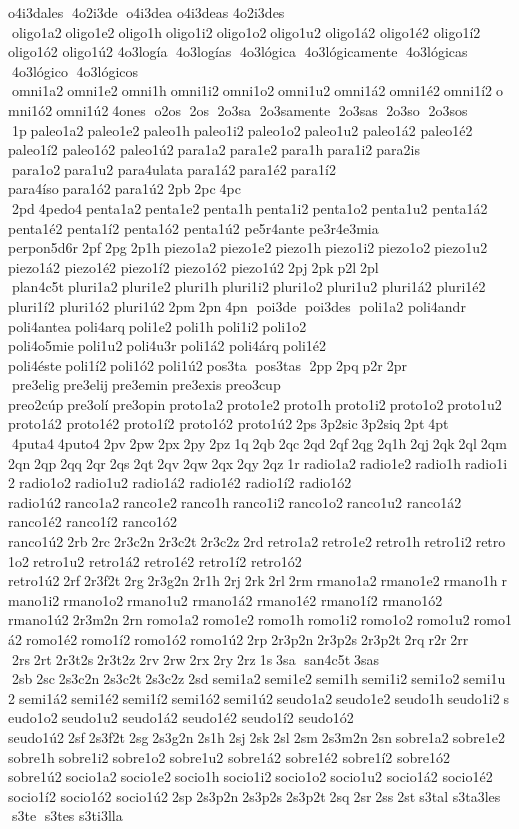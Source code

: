 o4i3dales  4o2i3de  o4i3dea  	o4i3deas  	4o2i3des  oligo1a2 oligo1e2 oligo1h oligo1i2 oligo1o2 oligo1u2 	oligo1á2 	oligo1é2 	oligo1í2 	oligo1ó2 	oligo1ú2 
4o3logía  4o3logías  4o3lógica  4o3lógicamente  4o3lógicas  4o3lógico  4o3lógicos  omni1a2 omni1e2 omni1h omni1i2 omni1o2 omni1u2 omni1á2 omni1é2 omni1í2 omni1ó2 omni1ú2 4ones  o2os  2os  2o3sa  2o3samente  2o3sas  2o3so  2o3sos  1p paleo1a2 paleo1e2 paleo1h paleo1i2 paleo1o2 paleo1u2 	paleo1á2 	paleo1é2 	paleo1í2 	paleo1ó2 	paleo1ú2 para1a2 para1e2 para1h para1i2 para2is  para1o2 para1u2 
para4ulata para1á2 para1é2 para1í2 	para4íso para1ó2 para1ú2 2pb 2pc 4pc  2pd 4pedo4 penta1a2 penta1e2 penta1h penta1i2 penta1o2 penta1u2 	penta1á2 	penta1é2 	penta1í2 	penta1ó2 	penta1ú2 	pe5r4ante 
pe3r4e3mia 
perpon5d6r 2pf 2pg 2p1h piezo1a2 piezo1e2 piezo1h piezo1i2 piezo1o2 piezo1u2 	piezo1á2 	piezo1é2 	piezo1í2 	piezo1ó2 	piezo1ú2 2pj 2pk p2l 2pl  plan4c5t pluri1a2 pluri1e2 pluri1h pluri1i2 pluri1o2 pluri1u2 	pluri1á2 	pluri1é2 	pluri1í2 	pluri1ó2 	pluri1ú2 2pm 2pn 4pn  poi3de  poi3des  poli1a2 	poli4andr 
poli4antea poli4arq poli1e2 poli1h poli1i2 poli1o2 
poli4o5mie poli1u2 poli4u3r poli1á2 	poli4árq poli1é2 
poli4éste poli1í2 poli1ó2 poli1ú2 pos3ta  pos3tas  2pp 2pq p2r 2pr  pre3elig pre3elij pre3emin pre3exis preo3cup 	preo2cúp pre3olí pre3opin proto1a2 proto1e2 proto1h proto1i2 proto1o2 proto1u2 	proto1á2 	proto1é2 	proto1í2 	proto1ó2 	proto1ú2 2ps 3p2sic 3p2siq 2pt 4pt  4puta4 4puto4 2pv 2pw 2px 2py 2pz 1q 2qb 2qc 2qd 2qf 2qg 2q1h 2qj 2qk 2ql 2qm 2qn 2qp 2qq 2qr 2qs 2qt 2qv 2qw 2qx 2qy 2qz 1r radio1a2 radio1e2 radio1h radio1i2 radio1o2 radio1u2 	radio1á2 	radio1é2 	radio1í2 	radio1ó2 	radio1ú2 ranco1a2 ranco1e2 ranco1h ranco1i2 ranco1o2 ranco1u2 	ranco1á2 	ranco1é2 	ranco1í2 	ranco1ó2 	ranco1ú2 2rb 2rc 2r3c2n 2r3c2t 2r3c2z 2rd retro1a2 retro1e2 retro1h retro1i2 retro1o2 retro1u2 	retro1á2 	retro1é2 	retro1í2 	retro1ó2 	retro1ú2 2rf 2r3f2t 2rg 2r3g2n 2r1h 2rj 2rk 2rl 2rm rmano1a2 rmano1e2 rmano1h rmano1i2 rmano1o2 rmano1u2 	rmano1á2 	rmano1é2 	rmano1í2 	rmano1ó2 	rmano1ú2 2r3m2n 2rn romo1a2 romo1e2 romo1h romo1i2 romo1o2 romo1u2 romo1á2 romo1é2 romo1í2 romo1ó2 romo1ú2 2rp 2r3p2n 2r3p2s 2r3p2t 2rq r2r 2rr  2rs 2rt 2r3t2s 2r3t2z 2rv 2rw 2rx 2ry 2rz 1s 3sa  san4c5t 3sas  2sb 2sc 2s3c2n 2s3c2t 2s3c2z 2sd semi1a2 semi1e2 semi1h semi1i2 semi1o2 semi1u2 semi1á2 semi1é2 semi1í2 semi1ó2 semi1ú2 seudo1a2 seudo1e2 seudo1h seudo1i2 seudo1o2 seudo1u2 	seudo1á2 	seudo1é2 	seudo1í2 	seudo1ó2 	seudo1ú2 2sf 2s3f2t 2sg 2s3g2n 2s1h 2sj 2sk 2sl 2sm 2s3m2n 2sn sobre1a2 sobre1e2 sobre1h sobre1i2 sobre1o2 sobre1u2 	sobre1á2 	sobre1é2 	sobre1í2 	sobre1ó2 	sobre1ú2 socio1a2 socio1e2 socio1h socio1i2 socio1o2 socio1u2 	socio1á2 	socio1é2 	socio1í2 	socio1ó2 	socio1ú2 2sp 2s3p2n 2s3p2s 2s3p2t 2sq 2sr 2ss 2st s3tal  	s3ta3les  s3te  s3tes  	s3ti3lla  
